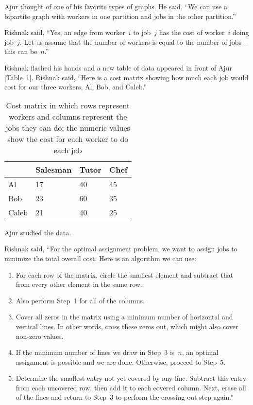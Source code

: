 Ajur thought of one of his favorite types of graphs. He said, ``We can use a bipartite graph with workers in one partition and jobs in the other partition.''

Rishnak said, ``Yes, an edge from worker~$i$ to job~$j$ has the cost of worker~$i$ doing job~$j$.
Let us assume that the number of workers is equal to the number of jobs---this can be~$n$.''

Rishnak flashed his hands and a new table of data appeared in front of Ajur [Table~\ref{16t3}]. Rishnak said, ``Here is a cost matrix showing how much each job would cost for our three workers, Al, Bob, and Caleb.''

\begin{table}
\begin{center}
\begin{tabular}{ ||p{2cm}||p{2cm}||p{1.5cm} ||p{1.5cm}|| }
 \hline
 
  & Salesman&Tutor&Chef\\
 \hline
 Al  & 17   &40&45\\
 Bob& 23&60&35\\
 Caleb&21&40&25\\

 
 \hline
\end{tabular}
\caption{Cost matrix in which rows represent workers and columns represent the jobs they can do; the numeric values show the cost for each worker to do each job}\label{16t3}
\end{center}
\end{table}

Ajur studied the data.

Rishnak said, ``For the optimal assignment problem, we want to assign jobs to minimize the total overall cost. Here is an algorithm we can use:

\begin{enumerate}
\item For each row of the matrix, circle the smallest element and subtract that from every other element in the same row.
\item Also perform Step~1 for all of the columns.
\item Cover all zeros in the matrix using a minimum number of horizontal and vertical lines. In other words, cross these zeros out, which might also cover non-zero values.
\item If the minimum number of lines we draw in Step~3 is~$n$, an optimal assignment is possible and we are done. Otherwise, proceed to Step~5.
\item Determine the smallest entry not yet covered by any line. Subtract this entry from each uncovered row, then add it to each covered column. Next, erase all of the lines and return to Step~3 to perform the crossing out step again.''
\end{enumerate}

